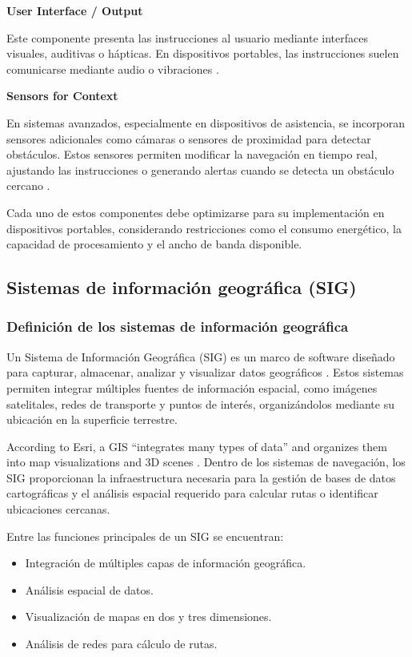 \textbf{User Interface / Output}

Este componente presenta las instrucciones al usuario mediante interfaces visuales, auditivas o hápticas. En dispositivos portables, las instrucciones suelen comunicarse mediante audio o vibraciones \cite{assistive_navigation_review}.

\textbf{Sensors for Context}

En sistemas avanzados, especialmente en dispositivos de asistencia, se incorporan sensores adicionales como cámaras o sensores de proximidad para detectar obstáculos. Estos sensores permiten modificar la navegación en tiempo real, ajustando las instrucciones o generando alertas cuando se detecta un obstáculo cercano \cite{elhashash2022_mobilemapping,assistive_navigation_review}.

Cada uno de estos componentes debe optimizarse para su implementación en dispositivos portables, considerando restricciones como el consumo energético, la capacidad de procesamiento y el ancho de banda disponible.

\subsection{Sistemas de información geográfica (SIG)}

\subsubsection{Definición de los sistemas de información geográfica}

Un Sistema de Información Geográfica (SIG) es un marco de software diseñado para capturar, almacenar, analizar y visualizar datos geográficos \cite{esri_gis}. Estos sistemas permiten integrar múltiples fuentes de información espacial, como imágenes satelitales, redes de transporte y puntos de interés, organizándolos mediante su ubicación en la superficie terrestre.

According to Esri, a GIS “integrates many types of data” and organizes them into map visualizations and 3D scenes \cite{esri_gis}. Dentro de los sistemas de navegación, los SIG proporcionan la infraestructura necesaria para la gestión de bases de datos cartográficas y el análisis espacial requerido para calcular rutas o identificar ubicaciones cercanas.

Entre las funciones principales de un SIG se encuentran:

\begin{itemize}
\item Integración de múltiples capas de información geográfica.
\item Análisis espacial de datos.
\item Visualización de mapas en dos y tres dimensiones.
\item Análisis de redes para cálculo de rutas.
\end{itemize}

